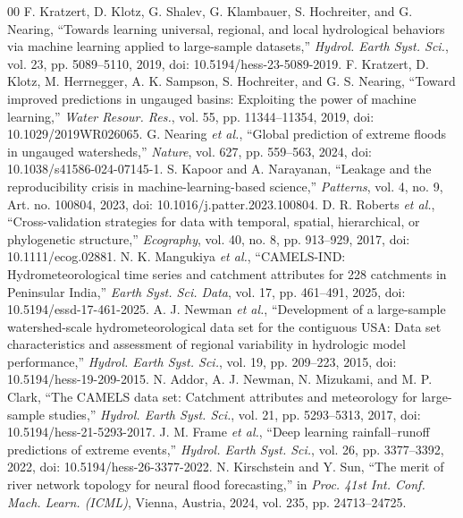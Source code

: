 \documentclass[conference]{IEEEtran}
\begin{document}
\balance
\begin{thebibliography}{00}
 F. Kratzert, D. Klotz, G. Shalev, G. Klambauer, S. Hochreiter, and G. Nearing, ``Towards learning universal, regional, and local hydrological behaviors via machine learning applied to large-sample datasets,'' \textit{Hydrol. Earth Syst. Sci.}, vol. 23, pp. 5089--5110, 2019, doi: 10.5194/hess-23-5089-2019.
 F. Kratzert, D. Klotz, M. Herrnegger, A. K. Sampson, S. Hochreiter, and G. S. Nearing, ``Toward improved predictions in ungauged basins: Exploiting the power of machine learning,'' \textit{Water Resour. Res.}, vol. 55, pp. 11344--11354, 2019, doi: 10.1029/2019WR026065.
 G. Nearing \textit{et al.}, ``Global prediction of extreme floods in ungauged watersheds,'' \textit{Nature}, vol. 627, pp. 559--563, 2024, doi: 10.1038/s41586-024-07145-1.
 S. Kapoor and A. Narayanan, ``Leakage and the reproducibility crisis in machine-learning-based science,'' \textit{Patterns}, vol. 4, no. 9, Art. no. 100804, 2023, doi: 10.1016/j.patter.2023.100804.
 D. R. Roberts \textit{et al.}, ``Cross-validation strategies for data with temporal, spatial, hierarchical, or phylogenetic structure,'' \textit{Ecography}, vol. 40, no. 8, pp. 913--929, 2017, doi: 10.1111/ecog.02881.
 N. K. Mangukiya \textit{et al.}, ``CAMELS-IND: Hydrometeorological time series and catchment attributes for 228 catchments in Peninsular India,'' \textit{Earth Syst. Sci. Data}, vol. 17, pp. 461--491, 2025, doi: 10.5194/essd-17-461-2025.
 A. J. Newman \textit{et al.}, ``Development of a large-sample watershed-scale hydrometeorological data set for the contiguous USA: Data set characteristics and assessment of regional variability in hydrologic model performance,'' \textit{Hydrol. Earth Syst. Sci.}, vol. 19, pp. 209--223, 2015, doi: 10.5194/hess-19-209-2015.
 N. Addor, A. J. Newman, N. Mizukami, and M. P. Clark, ``The CAMELS data set: Catchment attributes and meteorology for large-sample studies,'' \textit{Hydrol. Earth Syst. Sci.}, vol. 21, pp. 5293--5313, 2017, doi: 10.5194/hess-21-5293-2017.
 J. M. Frame \textit{et al.}, ``Deep learning rainfall--runoff predictions of extreme events,'' \textit{Hydrol. Earth Syst. Sci.}, vol. 26, pp. 3377--3392, 2022, doi: 10.5194/hess-26-3377-2022.
 N. Kirschstein and Y. Sun, ``The merit of river network topology for neural flood forecasting,'' in \textit{Proc. 41st Int. Conf. Mach. Learn. (ICML)}, Vienna, Austria, 2024, vol. 235, pp. 24713--24725.

\end{thebibliography}
\end{document}
